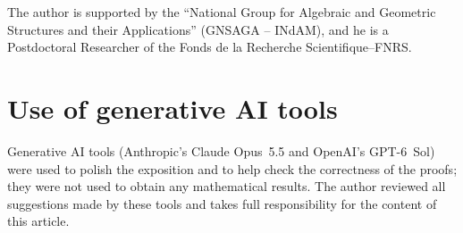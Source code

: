 \documentclass[reqno,a4paper]{amsart}
\theoremstyle{plain}
\theoremstyle{definition}
\theoremstyle{remark}
\numberwithin{equation}{section}
\begin{document}
The author is supported by the ``National Group for Algebraic and Geometric Structures and their Applications'' (GNSAGA -- INdAM), and he is a Postdoctoral Researcher of the Fonds de la Recherche Scientifique--FNRS. 


\section*{Use of generative AI tools}
Generative AI tools (Anthropic's Claude Opus~5.5 and OpenAI's GPT-6~Sol) were used to polish the exposition and to help check the correctness of the proofs; they were not used to obtain any mathematical results. The author reviewed all suggestions made by these tools and takes full responsibility for the content of this article.
\end{document}
